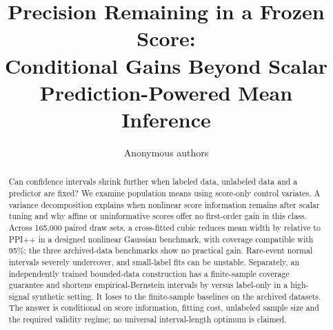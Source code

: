 \documentclass{article}
\title{Precision Remaining in a Frozen Score:\\Conditional Gains Beyond Scalar Prediction-Powered Mean Inference}
\author{Anonymous authors}
\date{}
\begin{document}
\maketitle
\begin{abstract}
Can confidence intervals shrink further when labeled data, unlabeled data and a predictor are fixed? We examine population means using score-only control variates. A variance decomposition explains when nonlinear score information remains after scalar tuning and why affine or uninformative scores offer no first-order gain in this class. Across 165,000 paired draw sets, a cross-fitted cubic reduces mean width by \QuadReduction{} relative to PPI++ in a designed nonlinear Gaussian benchmark, with coverage compatible with 95\%; the three archived-data benchmarks show no practical gain. Rare-event normal intervals severely undercover, and small-label fits can be unstable. Separately, an independently trained bounded-data construction has a finite-sample coverage guarantee and shortens empirical-Bernstein intervals by \BoundedReduction{} versus label-only in a high-signal synthetic setting. It loses to the finite-sample baselines on the archived datasets. The answer is conditional on score information, fitting cost, unlabeled sample size and the required validity regime; no universal interval-length optimum is claimed.
\end{abstract}

\clearpage


\clearpage


\end{document}
